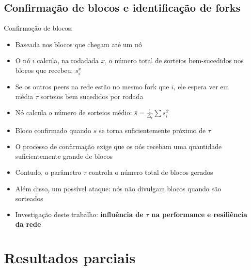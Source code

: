 \documentclass{beamer}
\begin{document}
\subsection{Confirmação de blocos e identificação de forks}
\begin{frame}
Confirmação de blocos:
\begin{itemize}
    \item Baseada nos blocos que chegam até um nó
    \item O nó $i$ calcula, na rodadada $x$, o número total de sorteios bem-sucedidos nos blocos que recebeu: $s_{i}^{x}$
    \item Se os outros peers na rede estão no mesmo fork que $i$, ele espera ver em média $\tau$ sorteios bem sucedidos por rodada
    \item Nó calcula o número de sorteios médio: $ \bar{s} = \frac{1}{\Delta_r} \sum s_i^x$
    \item Bloco confirmado quando $\bar{s}$ se torna suficientemente próximo de $\tau$
\end{itemize}
\end{frame}

\begin{frame}
\begin{itemize}
    \item O processo de confirmação exige que os nós recebam uma quantidade suficientemente grande de blocos
    \item Contudo, o parâmetro $\tau$ controla o número total de blocos gerados
    \item Além disso, um possível ataque: nós não divulgam blocos quando são sorteados
    \item Investigação deste trabalho: \textbf{influência de $\tau$ na performance e resiliência da rede}

\end{itemize}
\end{frame}

\section{Resultados parciais}
\end{document}
